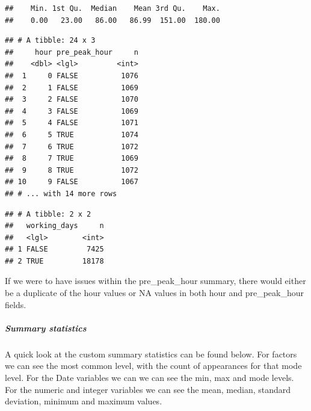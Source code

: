 \documentclass[12pt]{article}
\newenvironment{Shaded}{\begin{snugshade}}{\end{snugshade}}
\newcommand{\DataTypeTok}[1]{\textcolor[rgb]{0.13,0.29,0.53}{#1}}
\newcommand{\KeywordTok}[1]{\textcolor[rgb]{0.13,0.29,0.53}{\textbf{#1}}}
\newcommand{\NormalTok}[1]{#1}
\newcommand{\OperatorTok}[1]{\textcolor[rgb]{0.81,0.36,0.00}{\textbf{#1}}}
\newcommand{\StringTok}[1]{\textcolor[rgb]{0.31,0.60,0.02}{#1}}
\begin{document}
\begin{verbatim}
##    Min. 1st Qu.  Median    Mean 3rd Qu.    Max. 
##    0.00   23.00   86.00   86.99  151.00  180.00
\end{verbatim}

\begin{Shaded}
\end{Shaded}

\begin{verbatim}
## # A tibble: 24 x 3
##     hour pre_peak_hour     n
##    <dbl> <lgl>         <int>
##  1     0 FALSE          1076
##  2     1 FALSE          1069
##  3     2 FALSE          1070
##  4     3 FALSE          1069
##  5     4 FALSE          1071
##  6     5 TRUE           1074
##  7     6 TRUE           1072
##  8     7 TRUE           1069
##  9     8 TRUE           1072
## 10     9 FALSE          1067
## # ... with 14 more rows
\end{verbatim}

\begin{Shaded}
\end{Shaded}

\begin{verbatim}
## # A tibble: 2 x 2
##   working_days     n
##   <lgl>        <int>
## 1 FALSE         7425
## 2 TRUE         18178
\end{verbatim}

If we were to have issues within the pre\_peak\_hour summary, there
would either be a duplicate of the hour values or NA values in both hour
and pre\_peak\_hour fields.

\hypertarget{summary-statistics}{%
\subparagraph{Summary statistics}\label{summary-statistics}}

A quick look at the custom summary statistics can be found below. For
factors we can see the most common level, with the count of appearances
for that mode level. For the Date variables we can we can see the min,
max and mode levels. For the numeric and integer variables we can see
the mean, median, standard deviation, minimum and maximum values.

\begin{Shaded}
\end{Shaded}
\end{document}
